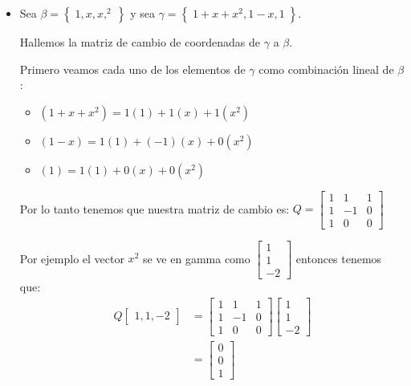 \documentclass[12pt, fleqn]{report}                             %
\theoremstyle{break}                                            %
\newcommand{\Set}[1]    {\left\{ \; #1 \; \right\}}             %
\newcommand{\bVector}[1]                                        %
        { \ensuremath{\begin{bmatrix}#1\end{bmatrix}} }             %
\begin{document}
                \begin{itemize}
                    \item 

                        Sea $\beta = \Set{1, x, x,^2}$ y sea $\gamma = \Set{1+x+x^2, 1-x, 1}$.

                        Hallemos la matriz de cambio de coordenadas de $\gamma$ a $\beta$.

                        Primero veamos cada uno de los elementos de $\gamma$ como combinación lineal de $\beta$:
                        \begin{itemize}
                            \item $(1+x+x^2) = 1(1) + 1(x) + 1(x^2)$
                            \item $(1-x) = 1(1) + (-1)(x) + 0(x^2)$
                            \item $(1) = 1(1) + 0(x) + 0(x^2)$
                        \end{itemize}

                        Por lo tanto tenemos que nuestra matriz de cambio es:
                        $Q = \bVector{1 & 1 & 1 \\ 1 & -1 & 0 \\ 1 & 0 & 0}$

                        Por ejemplo el vector $x^2$ se ve en gamma como $\bVector{1 \\ 1 \\ -2}$ entonces tenemos que:
                        \begin{align*}
                            Q\bVector{1, 1, -2}
                                &= \bVector{1 & 1 & 1 \\ 1 & -1 & 0 \\ 1 & 0 & 0} \bVector{1 \\ 1 \\ -2}        \\
                                &= \bVector{0 \\ 0 \\ 1}
                        \end{align*}
                \end{itemize}





\end{document}
